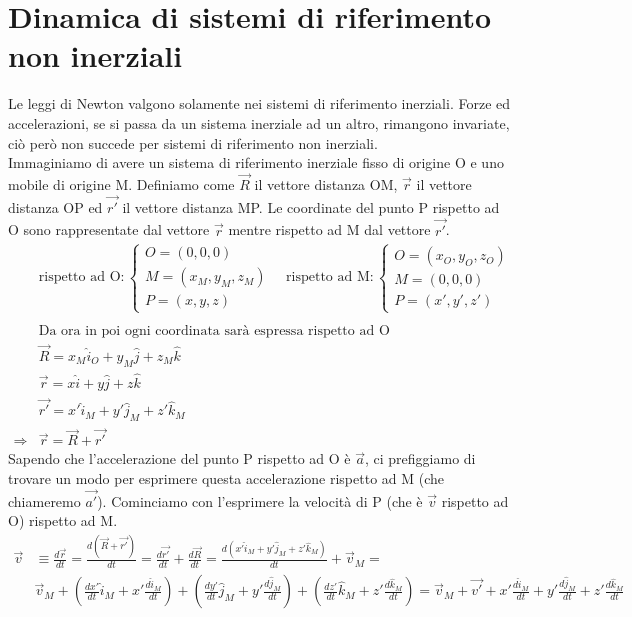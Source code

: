\documentclass[10pt,a4paper]{article}
\begin{document}
\section{Dinamica di sistemi di riferimento non inerziali}
Le leggi di Newton valgono solamente nei sistemi di riferimento inerziali. Forze ed accelerazioni, se si passa da un sistema inerziale ad un altro, rimangono invariate, ciò però non succede per sistemi di riferimento non inerziali.\\
Immaginiamo di avere un sistema di riferimento inerziale fisso di origine O e uno mobile di origine M. Definiamo come $\vec{R}$ il vettore distanza OM, $\vec{r}$ il vettore distanza OP ed $\vec{r'}$ il vettore distanza MP. Le coordinate del punto P rispetto ad O sono rappresentate dal vettore $\vec{r}$ mentre rispetto ad M dal vettore $\vec{r'}$. 
\begin{align*}
	&\text{rispetto ad O}:
\begin{cases}
	O = (0 ,0 ,0)\\
	M = (x_M, y_M, z_M)\\
	P = (x, y, z)
\end{cases} \quad
	\text{rispetto ad M}:
\begin{cases}
	O = (x_O, y_O, z_O)\\
	M = (0 ,0 ,0)\\
	P = (x', y', z')
\end{cases}\\\\
	&\text{Da ora in poi ogni coordinata sarà espressa rispetto ad O}\\
	&\vec{R} = x_M \hat{i}_O + y_M \hat{j} + z_M \hat{k}\\
	&\vec{r} =  x \hat{i} + y \hat{j} + z \hat{k}\\
	&\vec{r'} =  x' \hat{i}_M + y' \hat{j}_M + z' \hat{k}_M\\
	\Rightarrow &\vec{r} = \vec{R} + \vec{r'}
\end{align*}
Sapendo che l'accelerazione del punto P rispetto ad O è $\vec{a}$, ci prefiggiamo di trovare un modo per esprimere questa accelerazione rispetto ad M (che chiameremo $\vec{a'}$). Cominciamo con l'esprimere la velocità di P (che è $\vec{v}$ rispetto ad O) rispetto ad M. 
\begin{align*}
\vec{v} &\equiv \frac{d\vec{r}}{dt} = \frac{d(\vec{R} + \vec{r'})}{dt} = \frac{d\vec{r'}}{dt}+\frac{d\vec{R}}{dt} = \frac{d(x' \hat{i}_M + y' \hat{j}_M + z' \hat{k}_M)}{dt} + \vec{v}_M=\\
&\vec{v}_M + (\frac{dx'}{dt}\hat{i}_M + x'\frac{d\hat{i}_M}{dt}) + (\frac{dy'}{dt}\hat{j}_M + y'\frac{d\hat{j}_M}{dt}) +(\frac{dz'}{dt}\hat{k}_M + z'\frac{d\hat{k}_M}{dt}) = \vec{v}_M + \vec{v'} +  x'\frac{d\hat{i}_M}{dt} + y'\frac{d\hat{j}_M}{dt} + z'\frac{d\hat{k}_M}{dt}
\end{align*}
\end{document}
